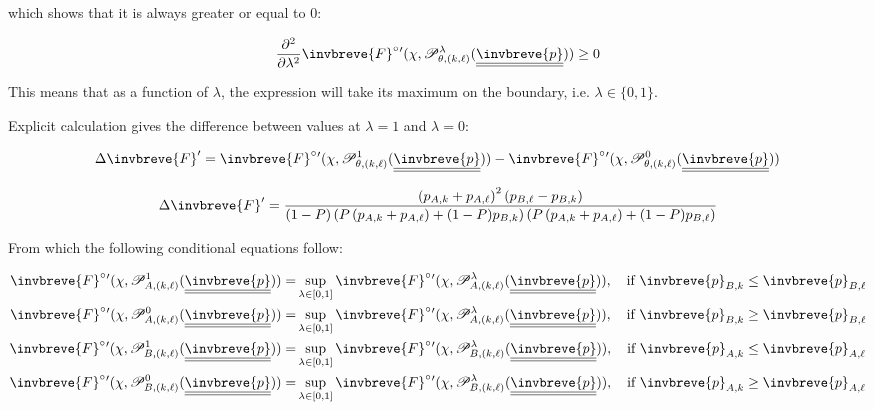 \documentclass{article}
\theoremstyle{definition}
\begin{document}
which shows that it is always greater or equal to $0$:

\begin{equation}
    \frac{\partial^2}{\partial \lambda^2}
    \invbreve{F}^\circ{}'(\chi,\mathscr{P}^\lambda_{\theta,(k,\ell)}(\underline{\underline{\invbreve{p}}})) \ge 0
\end{equation}

This means that as a function of $\lambda$, the expression will take its maximum on the boundary, i.e. $\lambda \in \{0,1\}$.

Explicit calculation gives the difference between values at $\lambda = 1$ and $\lambda=0$:

\begin{equation}
    \Delta \invbreve{F}' = 
    \invbreve{F}^\circ{}'(\chi,\mathscr{P}^1_{\theta,(k,\ell)}(\underline{\underline{\invbreve{p}}})) -
    \invbreve{F}^\circ{}'(\chi,\mathscr{P}^0_{\theta,(k,\ell)}(\underline{\underline{\invbreve{p}}}))
\end{equation}

\begin{equation}
    \Delta \invbreve{F}' = 
    \frac{\left(p_{A,k}+p_{A,\ell}\right)^2 \left(p_{B,\ell}-p_{B,k}\right)}
    {(1-P) \left(P \left(p_{A,k}+p_{A,\ell}\right)+(1-P) p_{B,k}\right) \left(P
\left(p_{A,k}+p_{A,\ell}\right)+(1-P) p_{B,\ell}\right)}
\end{equation}

From which the following conditional equations follow:

\begin{equation}
    \begin{split}
        \invbreve{F}^\circ{}'(\chi,\mathscr{P}^1_{A,(k,\ell)}(\underline{\underline{\invbreve{p}}})) = &
        \sup_{\lambda \in [0,1]} \invbreve{F}^\circ{}'(\chi,\mathscr{P}^\lambda_{A,(k,\ell)}(\underline{\underline{\invbreve{p}}})), \quad \text{if } \invbreve{p}_{B,k} \le \invbreve{p}_{B,\ell} \\
        \invbreve{F}^\circ{}'(\chi,\mathscr{P}^0_{A,(k,\ell)}(\underline{\underline{\invbreve{p}}})) = & 
        \sup_{\lambda \in [0,1]} \invbreve{F}^\circ{}'(\chi,\mathscr{P}^\lambda_{A,(k,\ell)}(\underline{\underline{\invbreve{p}}})), \quad \text{if } \invbreve{p}_{B,k} \ge \invbreve{p}_{B,\ell} \\
        \invbreve{F}^\circ{}'(\chi,\mathscr{P}^1_{B,(k,\ell)}(\underline{\underline{\invbreve{p}}})) = &
        \sup_{\lambda \in [0,1]} \invbreve{F}^\circ{}'(\chi,\mathscr{P}^\lambda_{B,(k,\ell)}(\underline{\underline{\invbreve{p}}})), \quad \text{if } \invbreve{p}_{A,k} \le \invbreve{p}_{A,\ell} \\
        \invbreve{F}^\circ{}'(\chi,\mathscr{P}^0_{B,(k,\ell)}(\underline{\underline{\invbreve{p}}})) = & 
        \sup_{\lambda \in [0,1]} \invbreve{F}^\circ{}'(\chi,\mathscr{P}^\lambda_{B,(k,\ell)}(\underline{\underline{\invbreve{p}}})), \quad \text{if } \invbreve{p}_{A,k} \ge \invbreve{p}_{A,\ell}
    \end{split}
\end{equation}
\end{document}
